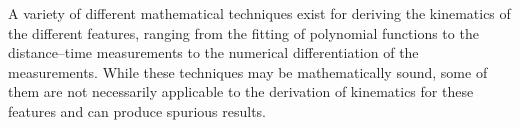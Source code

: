 \documentclass[structabstract]{aa}
\begin{document}
A variety of different mathematical techniques exist for deriving the kinematics of the different features, ranging from the fitting of polynomial functions to the distance--time measurements to the numerical differentiation of the measurements. While these techniques may be mathematically sound, some of them are not necessarily applicable to the derivation of kinematics for these features and can produce spurious results. 




\begin{figure}[!ht]
\centering
{}

\end{figure}
\end{document}
